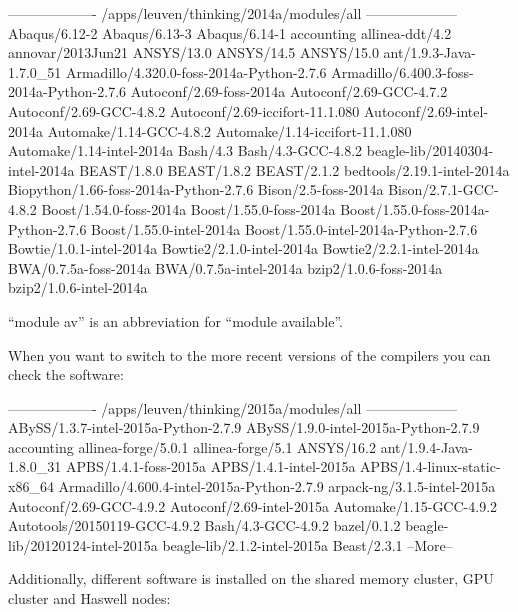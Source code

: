 \begin{prompt}
------------------- /apps/leuven/thinking/2014a/modules/all --------------------
Abaqus/6.12-2
Abaqus/6.13-3
Abaqus/6.14-1
accounting
allinea-ddt/4.2
annovar/2013Jun21
ANSYS/13.0
ANSYS/14.5
ANSYS/15.0
ant/1.9.3-Java-1.7.0_51
Armadillo/4.320.0-foss-2014a-Python-2.7.6
Armadillo/6.400.3-foss-2014a-Python-2.7.6
Autoconf/2.69-foss-2014a
Autoconf/2.69-GCC-4.7.2
Autoconf/2.69-GCC-4.8.2
Autoconf/2.69-iccifort-11.1.080
Autoconf/2.69-intel-2014a
Automake/1.14-GCC-4.8.2
Automake/1.14-iccifort-11.1.080
Automake/1.14-intel-2014a
Bash/4.3
Bash/4.3-GCC-4.8.2
beagle-lib/20140304-intel-2014a
BEAST/1.8.0
BEAST/1.8.2
BEAST/2.1.2
bedtools/2.19.1-intel-2014a
Biopython/1.66-foss-2014a-Python-2.7.6
Bison/2.5-foss-2014a
Bison/2.7.1-GCC-4.8.2
Boost/1.54.0-foss-2014a
Boost/1.55.0-foss-2014a
Boost/1.55.0-foss-2014a-Python-2.7.6
Boost/1.55.0-intel-2014a
Boost/1.55.0-intel-2014a-Python-2.7.6
Bowtie/1.0.1-intel-2014a
Bowtie2/2.1.0-intel-2014a
Bowtie2/2.2.1-intel-2014a
BWA/0.7.5a-foss-2014a
BWA/0.7.5a-intel-2014a
bzip2/1.0.6-foss-2014a
bzip2/1.0.6-intel-2014a
\end{prompt}

``module av'' is an abbreviation for ``module available''.

When you want to switch to the more recent versions of the compilers you can check the software:

\begin{prompt}
------------------- /apps/leuven/thinking/2015a/modules/all --------------------
ABySS/1.3.7-intel-2015a-Python-2.7.9
ABySS/1.9.0-intel-2015a-Python-2.7.9
accounting
allinea-forge/5.0.1
allinea-forge/5.1
ANSYS/16.2
ant/1.9.4-Java-1.8.0_31
APBS/1.4.1-foss-2015a
APBS/1.4.1-intel-2015a
APBS/1.4-linux-static-x86_64
Armadillo/4.600.4-intel-2015a-Python-2.7.9
arpack-ng/3.1.5-intel-2015a
Autoconf/2.69-GCC-4.9.2
Autoconf/2.69-intel-2015a
Automake/1.15-GCC-4.9.2
Autotools/20150119-GCC-4.9.2
Bash/4.3-GCC-4.9.2
bazel/0.1.2
beagle-lib/20120124-intel-2015a
beagle-lib/2.1.2-intel-2015a
Beast/2.3.1
--More--
\end{prompt}

Additionally, different software is installed on the shared memory cluster, GPU cluster and Haswell nodes:

